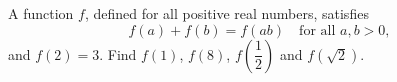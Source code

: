 A function $f$, defined for all positive real numbers, satisfies
\[
f(a)+f(b)=f(ab)\quad\text{for all }a,b>0,
\]
and $f(2)=3$. Find $f(1)$, $f(8)$, $f\left(\dfrac{1}{2}\right)$ and $f\left(\sqrt2\right)$.
